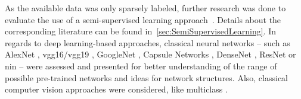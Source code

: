 \bigbreak
As the available data was only sparsely labeled, further research was done to evaluate the use of a semi-supervised learning approach~\citep{olivier2006semi,zhu05survey}. Details about the corresponding literature can be found in~\autoref{sec:SemiSupervisedLearning}. In regards to deep learning-based approaches, classical neural networks -- such as AlexNet \citep{alexnet2012original}, \acrshort{vgg}16/\acrshort{vgg}19 \citep{vgg2014original}, GoogleNet \citep{googlenet2015original}, Capsule Networks \citep{capsulenet2017original},  DenseNet \citep{densenet2017original}, ResNet \citep{resnet2016original} or \acrfull{nin} \citep{lin2013network} -- were assessed and presented for better understanding of the range of possible pre-trained networks and ideas for network structures. Also, classical computer vision approaches were considered, like multiclass  \citep{prakash2012multi}.
